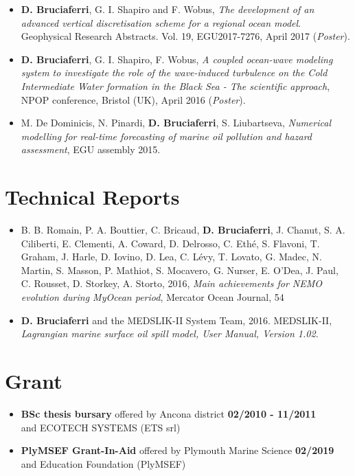 \documentclass[a4paper, oneside, final]{scrartcl}
\begin{document}
\begin{itemize}
\item \textbf{D. Bruciaferri}, G. I. Shapiro and F. Wobus, \textit{The development of an advanced vertical discretisation scheme for a regional ocean model}. Geophysical Research Abstracts. Vol. 19, EGU2017-7276, April 2017 (\textit{Poster}).
\item \textbf{D. Bruciaferri}, G. I. Shapiro, F. Wobus, \textit{A coupled ocean-wave modeling system to investigate the role of the wave-induced turbulence on the Cold Intermediate Water formation in the Black Sea - The scientific approach}, NPOP conference, Bristol (UK), April 2016 (\textit{Poster}).
\item M. De Dominicis, N. Pinardi, \textbf{D. Bruciaferri}, S. Liubartseva, \textit{Numerical modelling for real-time forecasting of marine oil pollution and hazard assessment}, EGU assembly 2015.
\end{itemize}
\section{Technical Reports}
\noindent
\normalsize
\begin{itemize}
\item B. B. Romain, P. A. Bouttier, C. Bricaud, \textbf{D. Bruciaferri}, J. Chanut, S. A. Ciliberti, E. Clementi, A. Coward, D. Delrosso, C. Ethé, S. Flavoni, T. Graham, J. Harle, D. Iovino, D. Lea, C. Lévy, T. Lovato, G. Madec, N. Martin, S. Masson, P. Mathiot, S. Mocavero, G. Nurser, E. O’Dea, J. Paul, C. Rousset, D. Storkey, A. Storto, 2016, \textit{Main achievements for NEMO evolution during MyOcean period}, Mercator Ocean Journal, 54
\item \textbf{D. Bruciaferri} and the MEDSLIK-II System Team, 2016. MEDSLIK-II, \textit{Lagrangian marine surface oil spill model, User Manual, Version 1.02}.\\
\end{itemize}
\section{Grant}
\noindent
\normalsize
\begin{itemize}
\item  \textbf{BSc thesis bursary} offered by Ancona district \hspace{3.cm} \textbf{02/2010 - 11/2011} \\
         and ECOTECH SYSTEMS (ETS srl)\\
\item  \textbf{PlyMSEF Grant-In-Aid} offered by Plymouth Marine Science \hspace{2.4cm} \textbf{02/2019} \\
         and Education Foundation (PlyMSEF)\\      
\end{itemize}
\pagebreak
\end{document}
